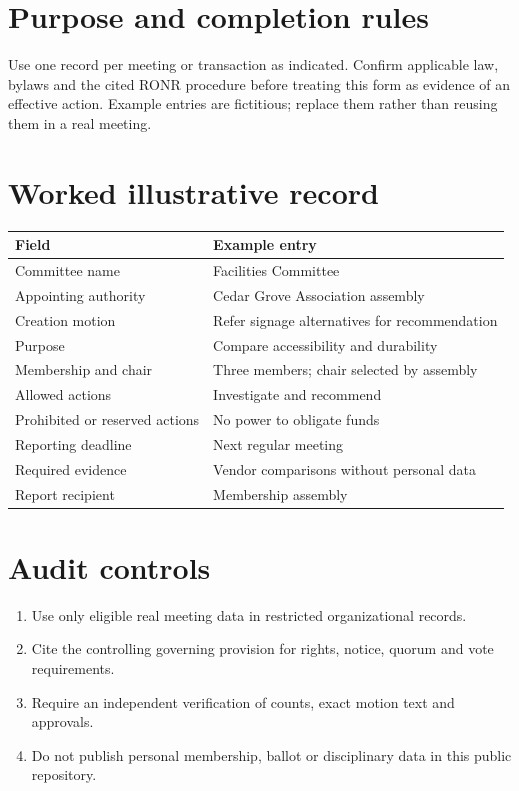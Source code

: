 \documentclass[11pt]{article}
\begin{document}
\SuiteOpen
\section{Purpose and completion rules}
Use one record per meeting or transaction as indicated. Confirm applicable law, bylaws and the cited RONR procedure before treating this form as evidence of an effective action. Example entries are fictitious; replace them rather than reusing them in a real meeting.

\section{Worked illustrative record}
\begin{longtable}{@{}p{.38\linewidth}p{.55\linewidth}@{}}\toprule Field & Example entry\\\midrule\endhead


Committee name & Facilities Committee\\
Appointing authority & Cedar Grove Association assembly\\
Creation motion & Refer signage alternatives for recommendation\\
Purpose & Compare accessibility and durability\\
Membership and chair & Three members; chair selected by assembly\\
Allowed actions & Investigate and recommend\\
Prohibited or reserved actions & No power to obligate funds\\
Reporting deadline & Next regular meeting\\
Required evidence & Vendor comparisons without personal data\\
Report recipient & Membership assembly\\
\bottomrule\end{longtable}
\section{Audit controls}
\begin{enumerate}[leftmargin=*,itemsep=4pt]
\item Use only eligible real meeting data in restricted organizational records.
\item Cite the controlling governing provision for rights, notice, quorum and vote requirements.
\item Require an independent verification of counts, exact motion text and approvals.
\item Do not publish personal membership, ballot or disciplinary data in this public repository.
\end{enumerate}
\end{document}

